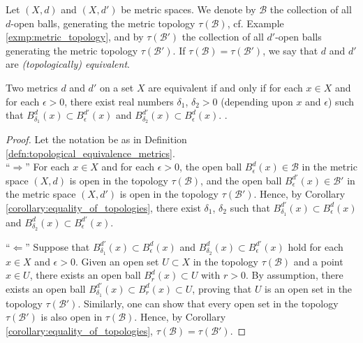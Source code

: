 \begin{defn}\label{defn:topological_equivalence_metrics}
	Let $(X, d)$ and $(X, d')$ be metric spaces. We denote by $\mathscr B$ the collection of all $d$-open balls, generating the metric topology $\tau(\mathscr B)$, cf. Example \ref{exmp:metric_topology}, and by $\tau(\mathscr B')$ the collection of all $d'$-open balls generating the metric topology $\tau(\mathscr B')$. If $\tau(\mathscr B) = \tau(\mathscr B')$, we say that $d$ and $d'$ are \textit{(topologically) equivalent}.
\end{defn}

\begin{theorem}\label{thrm:topological_equivalence}
	Two metrics $d$ and $d'$ on a set $X$ are equivalent if and only if for each $x\in X$ and for each $\epsilon > 0$, there exist real numbers $\delta_1$, $\delta_2 > 0$ (depending upon $x$ and $\epsilon$) such that $B^{d}_{\delta_1}(x) \subset B^{d'}_{\epsilon}(x)$ and $B^{d'}_{\delta_2}(x) \subset B^{d}_{\epsilon}(x)$. \cite{topology-singh}.
\end{theorem}

\begin{proof}
	Let the notation be as in Definition \ref{defn:topological_equivalence_metrics}.
	\\
	
	\enquote{$\Longrightarrow$} For each $x\in X$ and for each $\epsilon > 0$, the open ball $B^{d}_{\epsilon}(x)\in\mathscr B$ in the metric space $(X, d)$ is open in the topology $\tau(\mathscr B)$, and the open ball $B^{d'}_{\epsilon}(x)\in\mathscr B'$ in the metric space $(X, d')$ is open in the topology $\tau(\mathscr B')$. Hence, by Corollary \ref{corollary:equality_of_topologies}, there exist $\delta_1$, $\delta_2$ such that $B^{d'}_{\delta_1}(x) \subset B^{d}_{\epsilon}(x)$ and $B^{d}_{\delta_2}(x) \subset B^{d'}_{\epsilon}(x)$.
	
	\enquote{$\Longleftarrow$} Suppose that $B^{d'}_{\delta_1}(x) \subset B^{d}_{\epsilon}(x)$ and $B^{d}_{\delta_2}(x) \subset B^{d'}_{\epsilon}(x)$ hold for each $x\in X$ and $\epsilon > 0$. Given an open set $U\subset X$ in the topology $\tau(\mathscr B)$ and a point $x\in U$, there exists an open ball $B^{d}_{r}(x) \subset U$ with $r > 0$. By assumption, there exists an open ball $B^{d'}_{\delta_1}(x) \subset B^{d}_{r}(x) \subset U$, proving that $U$ is an open set in the topology $\tau(\mathscr B')$. Similarly, one can show that every open set in the topology $\tau(\mathscr B')$ is also open in $\tau(\mathscr B)$. Hence, by Corollary \ref{corollary:equality_of_topologies}, $\tau(\mathscr B) = \tau(\mathscr B')$.
\end{proof}

